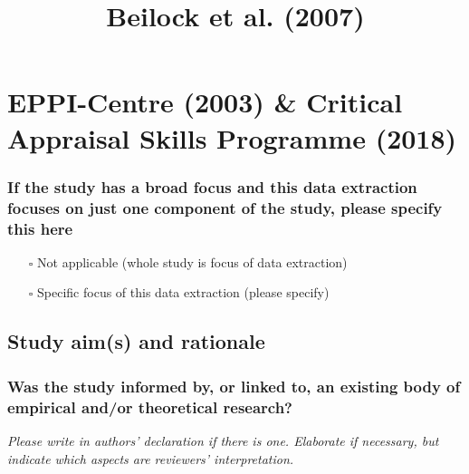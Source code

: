 \documentclass[
  doc, a4paper]{apa7}
\title{Beilock et al. (2007)}
\author{\phantom{0}}
\date{}
\affiliation{\phantom{0}}
\providecommand{\tightlist}{%
  \setlength{\itemsep}{0pt}\setlength{\parskip}{0pt}}
\begin{document}
\maketitle

\section{EPPI-Centre (2003) \& Critical Appraisal Skills Programme (2018)}\label{eppi-centrereviewguidelinesextracting2003-criticalappraisalskillsprogrammecaspsystematicreview2018}

\subsubsection{If the study has a broad focus and this data extraction focuses on just one component of the study, please specify this here}\label{if-the-study-has-a-broad-focus-and-this-data-extraction-focuses-on-just-one-component-of-the-study-please-specify-this-here}

\begin{itemize}
\tightlist
\item[$\square$]
  Not applicable (whole study is focus of data extraction)\\
\item[$\square$]
  Specific focus of this data extraction (please specify)
\end{itemize}

\subsection{Study aim(s) and rationale}\label{study-aims-and-rationale}

\subsubsection{Was the study informed by, or linked to, an existing body of empirical and/or theoretical research?}\label{was-the-study-informed-by-or-linked-to-an-existing-body-of-empirical-andor-theoretical-research}

\emph{Please write in authors' declaration if there is one. Elaborate if necessary, but indicate which aspects are reviewers' interpretation.}
\end{document}
